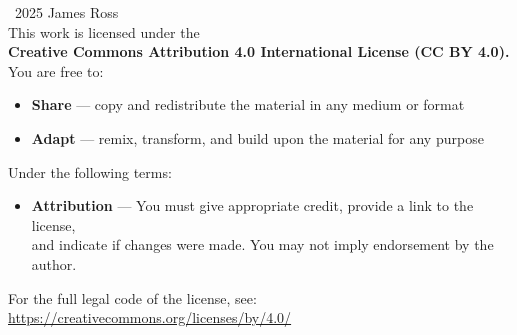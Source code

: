 \documentclass{aion}
\begin{document}
\AIONTitlePage

\cleardoublepage
\thispagestyle{empty}

\begin{center}
{\small
\vspace*{\fill}

\textcopyright~2025 James Ross\\[0.75em]

This work is licensed under the\\
\textbf{Creative Commons Attribution 4.0 International License (CC BY 4.0).}\\[1em]

You are free to:
\begin{itemize}[leftmargin=2em]
  \item \textbf{Share} — copy and redistribute the material in any medium or format
  \item \textbf{Adapt} — remix, transform, and build upon the material for any purpose
\end{itemize}

Under the following terms:
\begin{itemize}[leftmargin=2em]
  \item \textbf{Attribution} — You must give appropriate credit, provide a link to the license,\\
        and indicate if changes were made. You may not imply endorsement by the author.
\end{itemize}

For the full legal code of the license, see:\\[0.25em]
\url{https://creativecommons.org/licenses/by/4.0/}

\vspace*{\fill}
}
\end{center}

\cleardoublepage
\end{document}
